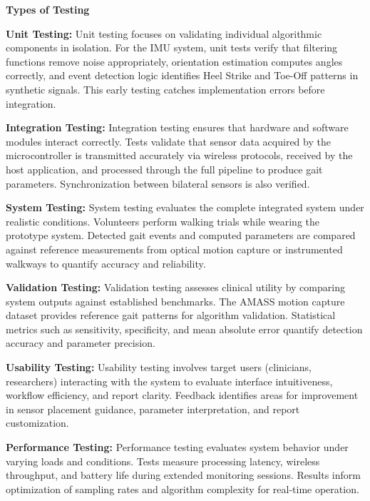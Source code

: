 \documentclass[12pt,a4paper]{report}
\begin{document}
\textbf{Types of Testing}

\textbf{Unit Testing:}  
Unit testing focuses on validating individual algorithmic components in isolation. For the IMU system, unit tests verify that filtering functions remove noise appropriately, orientation estimation computes angles correctly, and event detection logic identifies Heel Strike and Toe-Off patterns in synthetic signals. This early testing catches implementation errors before integration.

\vspace{0.3cm}

\textbf{Integration Testing:}  
Integration testing ensures that hardware and software modules interact correctly. Tests validate that sensor data acquired by the microcontroller is transmitted accurately via wireless protocols, received by the host application, and processed through the full pipeline to produce gait parameters. Synchronization between bilateral sensors is also verified.

\vspace{0.3cm}

\textbf{System Testing:}  
System testing evaluates the complete integrated system under realistic conditions. Volunteers perform walking trials while wearing the prototype system. Detected gait events and computed parameters are compared against reference measurements from optical motion capture or instrumented walkways to quantify accuracy and reliability.

\vspace{0.3cm}

\textbf{Validation Testing:}  
Validation testing assesses clinical utility by comparing system outputs against established benchmarks. The AMASS motion capture dataset provides reference gait patterns for algorithm validation. Statistical metrics such as sensitivity, specificity, and mean absolute error quantify detection accuracy and parameter precision.

\vspace{0.3cm}

\textbf{Usability Testing:}  
Usability testing involves target users (clinicians, researchers) interacting with the system to evaluate interface intuitiveness, workflow efficiency, and report clarity. Feedback identifies areas for improvement in sensor placement guidance, parameter interpretation, and report customization.

\vspace{0.3cm}

\textbf{Performance Testing:}  
Performance testing evaluates system behavior under varying loads and conditions. Tests measure processing latency, wireless throughput, and battery life during extended monitoring sessions. Results inform optimization of sampling rates and algorithm complexity for real-time operation.
\end{document}
